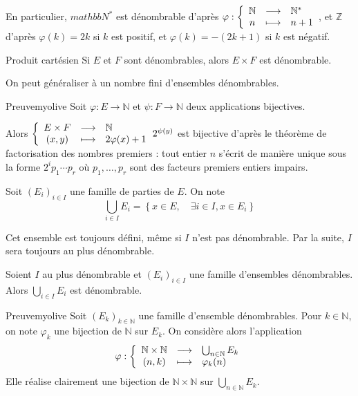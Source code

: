     En particulier, $mathbb{N}^*$ est dénombrable d’après $\fonction{\varphi}{\mathbb{N}}{\mathbb{N}^*}{n}{n+1}$, et $\mathbb{Z}$ d’après $\varphi(k) = 2k$ si $k$ est positif, et $\varphi(k) = -(2k+1)$ si $k$ est négatif.

    \begin{prop}{Produit cartésien}{}
        Si $E$ et $F$ sont dénombrables, alors $E \times F$ est dénombrable.
    \end{prop}

    On peut généraliser à un nombre fini d’ensembles dénombrables.

    \begin{demo}{Preuve}{myolive}
        Soit $\varphi : E \to \mathbb{N}$ et $\psi : F \to \mathbb{N}$ deux applications bijectives. 

        Alors $\application{E \times F}{\mathbb{N}}{(x,y)}{2 \varphi(x) + 1} 2^{\psi(y)}$ est bijective d’après le théorème de factorisation des nombres premiers : tout entier $n$ s’écrit de manière unique sous la forme $2^i p_1 \cdots p_r$ où $p_1, \ldots, p_r$ sont des facteurs premiers entiers impairs.
    \end{demo}

    \begin{defi}{}{}
        Soit $(E_i)_{i \in I}$ une famille de parties de $E$. On note 
        \[ \bigcup_{i \in I} E_i = \left\{x \in E, \quad \exists i \in I, x \in E_i\right\} \]    
    \end{defi}

    Cet ensemble est toujours défini, même si $I$ n’est pas dénombrable. Par la suite, $I$ sera toujours au plus dénombrable.

    \begin{prop}{}{}
        Soient $I$ au plus dénombrable et $(E_i)_{i \in I}$ une famille d’ensembles dénombrables. Alors $\bigcup_{i \in I} E_i$ est dénombrable.
    \end{prop}

    \begin{demo}{Preuve}{myolive}
        Soit $(E_k)_{k \in \mathbb{N}}$ une famille d’ensemble dénombrables. Pour $k \in \mathbb{N}$, on note $\varphi_k$ une bijection de $\mathbb{N}$ sur $E_k$. On considère alors l’application 
        \[ \fonction{\varphi}{\mathbb{N} \times \mathbb{N}}{\bigcup_{n \in \mathbb{N}} E_k}{(n,k)}{\varphi_k(n)} \]    
        Elle réalise clairement une bijection de $\mathbb{N} \times \mathbb{N}$ sur $\bigcup_{n \in \mathbb{N}} E_k$.
    \end{demo}


